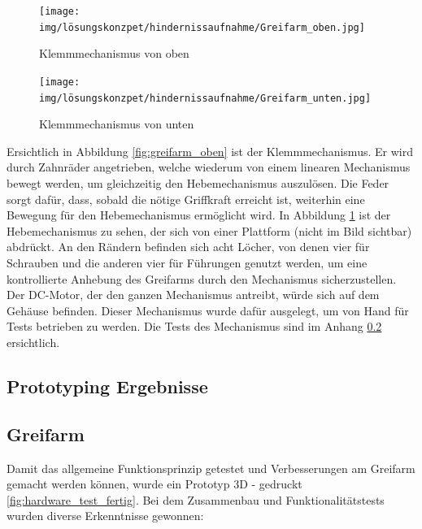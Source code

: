 \documentclass[../main.tex]{subfiles}
\begin{document}
\begin{figure}[h!]
    \centering
    \begin{minipage}[t]{0.45\textwidth}
        \centering
        \texttt{[image: img/lösungskonzpet/hindernissaufnahme/Greifarm\_oben.jpg]}
        \caption{Klemmmechanismus von oben}
        \label{fig:greifarm_oben}
    \end{minipage}
    \hfill
    \begin{minipage}[t]{0.45\textwidth}
        \centering
        \texttt{[image: img/lösungskonzpet/hindernissaufnahme/Greifarm\_unten.jpg]}
        \caption{Klemmmechanismus von unten}
        \label{fig:greifarm_unten}
    \end{minipage}
\end{figure}

Ersichtlich in Abbildung \ref{fig:greifarm_oben} ist der Klemmmechanismus. Er wird durch Zahnräder angetrieben, welche wiederum von einem linearen Mechanismus bewegt werden, um gleichzeitig den Hebemechanismus auszulösen. Die Feder sorgt dafür, dass, sobald die nötige Griffkraft erreicht ist, weiterhin eine Bewegung für den Hebemechanismus ermöglicht wird. In Abbildung \ref{fig:greifarm_unten} ist der Hebemechanismus zu sehen, der sich von einer Plattform (nicht im Bild sichtbar) abdrückt. An den Rändern befinden sich acht Löcher, von denen vier für Schrauben und die anderen vier für Führungen genutzt werden, um eine kontrollierte Anhebung des Greifarms durch den Mechanismus sicherzustellen.
Der DC-Motor, der den ganzen Mechanismus antreibt, würde sich auf dem Gehäuse befinden. Dieser Mechanismus wurde dafür ausgelegt, um von Hand für Tests betrieben zu werden. Die Tests des Mechanismus sind im Anhang \ref{sec:hardware_greifarm} ersichtlich.

\subsection{Prototyping Ergebnisse}

\newpage    
\subsection{Greifarm} \label{sec:hardware_greifarm}
Damit das allgemeine Funktionsprinzip getestet und Verbesserungen am Greifarm gemacht werden können, wurde ein Prototyp 3D - gedruckt \ref{fig:hardware_test_fertig}. Bei dem Zusammenbau und Funktionalitätstests wurden diverse Erkenntnisse gewonnen:
\end{document}
